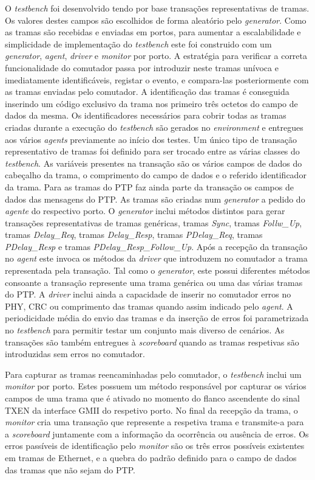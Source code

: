 O \textit{testbench} foi desenvolvido tendo por base transações representativas de tramas. Os valores destes campos são escolhidos de forma aleatório pelo \textit{generator}. Como as tramas são recebidas e enviadas em portos, para aumentar a escalabilidade e simplicidade de implementação do \textit{testbench} este foi construido com um \textit{generator}, \textit{agent}, \textit{driver} e \textit{monitor} por porto. A estratégia para verificar a correta funcionalidade do comutador passa por introduzir neste tramas unívoca e imediatamente identificáveis, registar o evento, e compara-las posteriormente com as tramas enviadas pelo comutador. A identificação das tramas é conseguida inserindo um código exclusivo da trama nos primeiro três octetos do campo de dados da mesma. Os identificadores necessários para cobrir todas as tramas criadas durante a execução do \textit{testbench} são gerados no \textit{environment} e entregues aos vários \textit{agents} previamente ao início dos testes. Um único tipo de transação representativo de tramas foi definido para ser trocado entre as várias classes do \textit{testbench}. As variáveis presentes na transação são os vários campos de dados do cabeçalho da trama, o comprimento do campo de dados e o referido identificador da trama. Para as tramas do PTP faz ainda parte da transação os campos de dados das mensagens do PTP. As tramas são criadas num \textit{generator} a pedido do \textit{agente} do respectivo porto. O \textit{generator} inclui métodos distintos para gerar transações representativas de tramas genéricas, tramas \textit{Sync}, tramas \textit{Follw\_Up}, tramas \textit{Delay\_Req}, tramas \textit{Delay\_Resp}, tramas \textit{PDelay\_Req}, tramas \textit{PDelay\_Resp} e tramas \textit{PDelay\_Resp\_Follow\_Up}. Após a recepção da transação no \textit{agent} este invoca os métodos da \textit{driver} que introduzem no comutador a trama representada pela transação. Tal como o \textit{generator}, este possui diferentes métodos consoante a transação represente uma trama genérica ou uma das várias tramas do PTP. A \textit{driver} inclui ainda a capacidade de inserir no comutador erros no PHY, CRC ou comprimento das tramas quando assim indicado pelo \textit{agent}. A periodicidade média do envio das tramas e da inserção de erros foi parametrizada no \textit{testbench} para permitir testar um conjunto mais diverso de cenários. As transações são também entregues à \textit{scoreboard} quando as tramas respetivas são introduzidas sem erros no comutador. \par 
Para capturar as tramas reencaminhadas pelo comutador, o \textit{testbench} inclui um \textit{monitor} por porto. Estes possuem um método responsável por capturar os vários campos de uma trama que é ativado no momento do flanco ascendente do sinal TXEN da interface GMII do respetivo porto. No final da recepção da trama, o \textit{monitor} cria uma transação que represente a respetiva trama e transmite-a para a \textit{scoreboard} juntamente com a informação da ocorrência ou ausência de erros. Os erros passíveis de identificação pelo \textit{monitor} são os três erros possíveis existentes em tramas de Ethernet, e a quebra do padrão definido para o campo de dados das tramas que não sejam do PTP. \par
